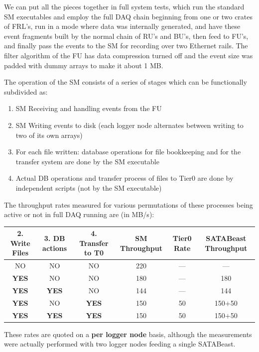 We can put all the pieces together in full system tests, 
which run the standard SM executables
and employ the full DAQ chain beginning from one or two crates of FRL's,  
run in a  mode where data was internally generated,
and have these event fragments built by the normal chain of RU's and BU's,
then feed to FU's, and finally
pass the events to the SM for recording over two Ethernet rails.
The filter algorithm of the FU has data  compression turned off and 
the event size was padded with dummy arrays to make it about 1 MB.

The operation of the SM consists of a series of stages which can be
functionally subdivided as:
\begin{enumerate}
  \item SM Receiving and handling events from the FU  
  \item SM Writing events to disk (each logger node alternates between writing to two of its own  arrays)
  \item For each file written: database operations for file bookkeeping and for the transfer system 
        are done by the SM executable
  \item Actual DB operations and transfer process of files to Tier0 are done by independent scripts
        (not by the SM executable) 

\end{enumerate}
The throughput rates measured for various permutations of these processes being
active or not in full DAQ running  are (in MB/s):
\begin{center}
\begin{tabular}{c|c|c|c|c|c} 
2. Write Files & 3. DB actions & 4. Transfer to T0 & SM Throughput  & Tier0 Rate& SATABeast Throughput  \\ \hline
   NO       &   NO       &    NO          &       220      &   --- &   ---       \\
 {\bf YES}  &   NO       &    NO          &       180      &   --- &   180       \\
 {\bf YES}  &  {\bf YES} &    NO          &       144      &   --- &   144       \\
 {\bf YES}  &   NO       &   {\bf YES}    &       150      &    50 &   150$+$50  \\
 {\bf YES}  &  {\bf YES} &   {\bf YES}    &       150      &    50 &   150$+$50  \\
\end{tabular}
\label{tab:rates}
\end{center}
These rates are quoted on  a {\bf per logger node} basis, although the measurements
were actually performed with two logger nodes feeding a single SATABeast.


